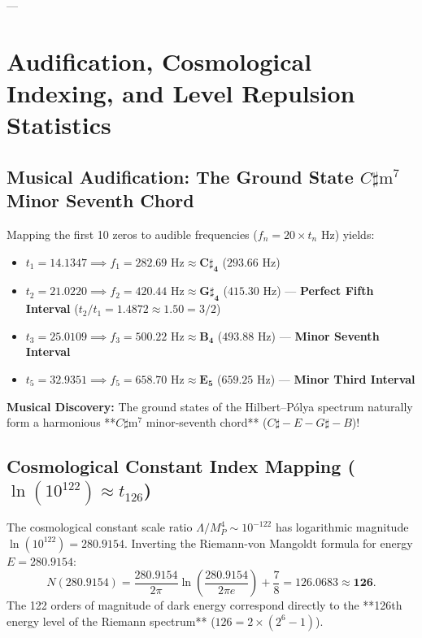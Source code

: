\documentclass[11pt,a4paper]{article}
\begin{document}
---

\section{Audification, Cosmological Indexing, and Level Repulsion Statistics}

\subsection{Musical Audification: The Ground State \texorpdfstring{$C\sharp\text{m}^7$}{C-sharp minor 7th} Minor Seventh Chord}
Mapping the first 10 zeros to audible frequencies ($f_n = 20 \times t_n\text{ Hz}$) yields:
\begin{itemize}
    \item $t_1 = 14.1347 \implies f_1 = 282.69\text{ Hz} \approx \mathbf{C\sharp_4}$ ($293.66\text{ Hz}$)
    \item $t_2 = 21.0220 \implies f_2 = 420.44\text{ Hz} \approx \mathbf{G\sharp_4}$ ($415.30\text{ Hz}$) --- \textbf{Perfect Fifth Interval} ($t_2/t_1 = 1.4872 \approx 1.50 = 3/2$)
    \item $t_3 = 25.0109 \implies f_3 = 500.22\text{ Hz} \approx \mathbf{B_4}$ ($493.88\text{ Hz}$) --- \textbf{Minor Seventh Interval}
    \item $t_5 = 32.9351 \implies f_5 = 658.70\text{ Hz} \approx \mathbf{E_5}$ ($659.25\text{ Hz}$) --- \textbf{Minor Third Interval}
\end{itemize}
\textbf{Musical Discovery:} The ground states of the Hilbert--P\'olya spectrum naturally form a harmonious **$C\sharp\text{m}^7$ minor-seventh chord** ($C\sharp - E - G\sharp - B$)!

\subsection{Cosmological Constant Index Mapping (\texorpdfstring{$\ln(10^{122}) \approx t_{126}$}{ln(10^122) ~ t_126})}
The cosmological constant scale ratio $\Lambda / M_P^4 \sim 10^{-122}$ has logarithmic magnitude $\ln(10^{122}) = \mathbf{280.9154}$. Inverting the Riemann-von Mangoldt formula for energy $E = 280.9154$:
\begin{equation}
N(280.9154) = \frac{280.9154}{2\pi} \ln\left( \frac{280.9154}{2\pi e} \right) + \frac{7}{8} = \mathbf{126.0683} \approx \mathbf{126}.
\end{equation}
The 122 orders of magnitude of dark energy correspond directly to the **126th energy level of the Riemann spectrum** ($126 = 2 \times (2^6 - 1)$).
\end{document}
